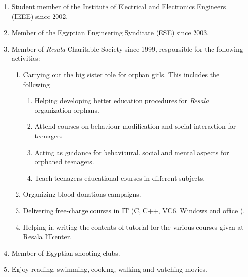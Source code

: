 \documentclass{article}
\begin{document}
\begin{enumerate}
\item  Student member of the Institute of Electrical and Electronics Engineers
(IEEE) since 2002.
\item  Member of the Egyptian Engineering Syndicate (ESE) since 2003.
\item  Member of \textit{Resala} Charitable Society since 1999, responsible for
the following activities:
\begin{enumerate}
\item  Carrying out the big sister role for orphan girls. This includes the following
  \begin{enumerate}
\item Helping developing better education procedures for \textit{Resala}
organization orphans.
\item Attend courses on behaviour modification and  social interaction for
teenagers.
\item Acting as guidance for behavioural, social and mental aspects for orphaned
teenagers.

\item Teach teenagers educational courses in different subjects.
\end{enumerate}
\item  Organizing blood donations campaigns.
\item  Delivering free-charge courses in IT (C, C++, VC6, Windows and office ).
\item  Helping in writing the contents of tutorial for the various courses given at Resala ITcenter.
\end{enumerate}
\item  Member of Egyptian shooting clubs.
\item  Enjoy reading, swimming, cooking, walking and watching movies.
\end{enumerate}
%
%
\end{document}
